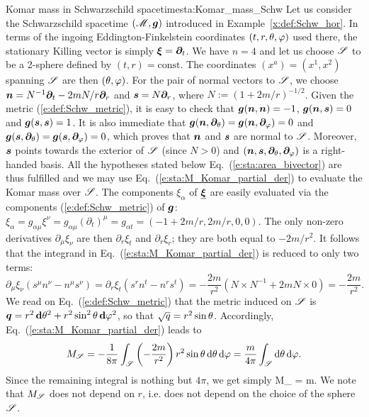 \begin{texample}{Komar mass in Schwarzschild spacetime}{sta:Komar_mass_Schw}
Let us consider the Schwarzschild spacetime $(\mathscr{M},\bm{g})$
introduced in
Example~\ref{x:def:Schw_hor}.
In terms of the ingoing Eddington-Finkelstein coordinates $(t,r,\theta,\varphi)$ used there,
the stationary Killing vector is simply $\bm{\xi} = \bm{\partial}_t$.
We have $n=4$ and let us choose $\mathscr{S}$ to be a 2-sphere defined by $(t,r) = \mathrm{const}$.
The coordinates $(x^a) = (x^1, x^2)$ spanning $\mathscr{S}$ are then $(\theta,\varphi)$.
For the pair of normal vectors to $\mathscr{S}$, we choose
$\bm{n} = N^{-1} \bm{\partial}_t  - 2mN/r \bm{\partial}_r$ and $\bm{s} = N \bm{\partial}_r$, where
$N := (1 + 2m/r)^{-1/2}$. Given the metric (\ref{e:def:Schw_metric}), it is
easy to check that
$\bm{g}(\bm{n},\bm{n}) = -1$, $\bm{g}(\bm{n},\bm{s}) = 0$ and $\bm{g}(\bm{s},\bm{s}) = 1$.
It is also immediate that $\bm{g}(\bm{n},\bm{\partial}_\theta) = \bm{g}(\bm{n},\bm{\partial}_\varphi) =  0$ and
$\bm{g}(\bm{s},\bm{\partial}_\theta) = \bm{g}(\bm{s},\bm{\partial}_\varphi) =  0$,
which proves that $\bm{n}$ and $\bm{s}$ are normal to $\mathscr{S}$.
Moreover, $\bm{s}$ points towards the exterior of $\mathscr{S}$ (since $N>0$) and
$(\bm{n},\bm{s},\bm{\partial}_\theta,\bm{\partial}_\varphi)$ is a right-handed basis. All the hypotheses
stated below Eq.~(\ref{e:sta:area_bivector}) are thus fulfilled and we may use
Eq.~(\ref{e:sta:M_Komar_partial_der}) to evaluate the Komar mass over $\mathscr{S}$.
The components $\xi_\alpha$ of $\underline{\bm{\xi}}$ are easily evaluated via
the components (\ref{e:def:Schw_metric}) of $\bm{g}$:
$\xi_\alpha = g_{\alpha\mu} \xi^\nu = g_{\alpha\mu} (\partial_t)^\mu = g_{\alpha t}
= (-1 + 2m/r, 2m/r, 0, 0)$.
The only non-zero derivatives $\partial_\mu\xi_\nu$
are then $\partial_r \xi_t$ and $\partial_r \xi_r$; they are both equal to $-2m/r^2$.
It follows that the integrand in Eq.~(\ref{e:sta:M_Komar_partial_der}) is reduced to only two terms:
\[
  \partial_\mu \xi_\nu (s^\mu   n^\nu - n^\mu s^\nu) =
  \partial_r \xi_t (s^r n^t - n^r s^t) = - \frac{2m}{r^2}
  \left( N \times N^{-1}  + 2m N\times 0 \right) = - \frac{2m}{r^2} .
\]
We read on Eq.~(\ref{e:def:Schw_metric}) that the metric induced on
$\mathscr{S}$ is $\bm{q} = r^2 \, \mathbf{d}\theta^2 + r^2 \sin^2 \theta  \, \mathbf{d}\varphi^2$, so that $\sqrt{q} = r^2 \sin\theta$.
Accordingly, Eq.~(\ref{e:sta:M_Komar_partial_der}) leads to
\[
    M_{\mathscr{S}} = -\frac{1}{8\pi} \int_{\mathscr{S}} \left( - \frac{2m}{r^2} \right)
    r^2 \sin\theta \, \mathrm{d}\theta \, \mathrm{d}\varphi = \frac{m}{4\pi} \int_{\mathscr{S}} \mathrm{d}\theta \, \mathrm{d}\varphi .
\]
Since the remaining integral is nothing but $4\pi$, we get simply
\be \label{e:sta:Komar_mass_Schwarz}
    M_{\Sp} = m.
\ee
We note that $M_{\mathscr{S}}$ does not depend on $r$, i.e. does not depend on the
choice of the sphere $\mathscr{S}$.
\end{texample}

